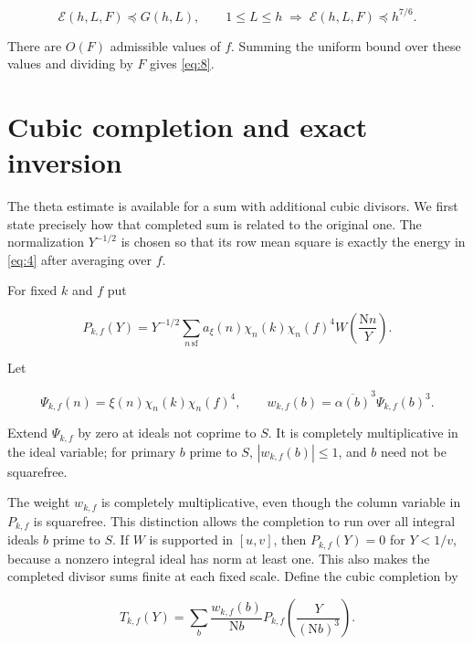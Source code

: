 \documentclass[reqno,a4paper,11pt]{amsart}
\begin{document}
\begin{equation}\label{eq:8}
\mathcal{E}\left( h,L,F\right) \preccurlyeq G\left( h,L\right) ,\quad \quad 1\le L\le h\;\Longrightarrow \;\mathcal{E}\left( h,L,F\right) \preccurlyeq {h}^{7/6}.
\end{equation}

There are $O(F)$ admissible values of $f$. Summing the uniform bound over these values and dividing by $F$ gives \eqref{eq:8}.

\section{Cubic completion and exact inversion}

The theta estimate is available for a sum with additional cubic divisors. We first state precisely how that completed sum is related to the original one. The normalization $Y^{-1/2}$ is chosen so that its row mean square is exactly the energy in \eqref{eq:4} after averaging over $f$.

For fixed $k$ and $f$ put

\begin{equation}\label{eq:9}
{P}_{k,f}\left( Y\right) ={Y}^{-1/2}\sum _{n\,\mathrm{sf}} {a}_{\xi }\left( n\right) {\chi }_{n}\left( k\right) {\chi }_{n}{\left( f\right) }^{4}W\left( \frac{\mathrm{N}n}{Y}\right) .
\end{equation}

Let

\[
{\Psi }_{k,f}\left( n\right) =\xi \left( n\right) {\chi }_{n}\left( k\right) {\chi }_{n}{\left( f\right) }^{4},\quad \quad {w}_{k,f}\left( b\right) ={\overline{\alpha \left( b\right) }}^{3}{\Psi }_{k,f}{\left( b\right) }^{3}.
\]

Extend $\Psi_{k,f}$ by zero at ideals not coprime to $S$. It is completely multiplicative in the ideal variable; for primary $b$ prime to $S$, $|w_{k,f}(b)|\le1$, and $b$ need not be squarefree.

The weight $w_{k,f}$ is completely multiplicative, even though the column variable in $P_{k,f}$ is squarefree. This distinction allows the completion to run over all integral ideals $b$ prime to $S$. If $W$ is supported in $[u,v]$, then $P_{k,f}(Y)=0$ for $Y<1/v$, because a nonzero integral ideal has norm at least one. This also makes the completed divisor sums finite at each fixed scale. Define the cubic completion by

\begin{equation}\label{eq:10}
{T}_{k,f}\left( Y\right) =\sum _{b} \frac{{w}_{k,f}\left( b\right) }{\mathrm{N}b}{P}_{k,f}\left( \frac{Y}{{\left( \mathrm{N}b\right) }^{3}}\right) .
\end{equation}
\end{document}
